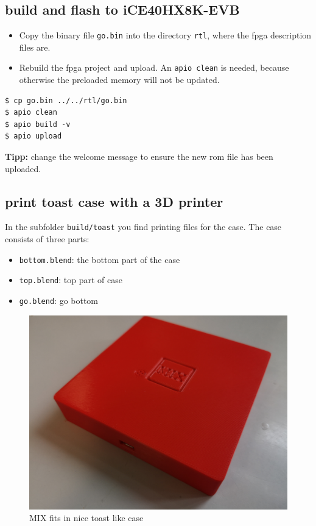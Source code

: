 \documentclass[a4paper,ngerman]{scrartcl}
\begin{document}
\subsection{build and flash to iCE40HX8K-EVB}

\begin{itemize}
	\item Copy the binary file \lstinline|go.bin| into the directory \lstinline|rtl|, where the fpga description files are.
	\item Rebuild the fpga project and upload. An \lstinline|apio clean| is needed, because otherwise the preloaded memory will not be updated.	
\end{itemize}

\begin{lstlisting}[numbers=none,frame=none]
$ cp go.bin ../../rtl/go.bin
$ apio clean
$ apio build -v
$ apio upload
\end{lstlisting}

\textbf{Tipp:} change the welcome message to ensure the new rom file has been uploaded.

\subsection{print toast case with a 3D printer}
In the subfolder \lstinline|build/toast| you find printing files for the case. The case consists of three parts:

\begin{itemize}
\item \lstinline|bottom.blend|: the bottom part of the case
\item \lstinline|top.blend|: top part of case
\item \lstinline|go.blend|: go bottom
\end{itemize}

\begin{figure}
	\centering
	\includegraphics[width=0.6\linewidth]{MIX_real.jpg}
	\caption{MIX fits in nice toast like case}
	\label{fig:toast}
\end{figure}
\end{document}
